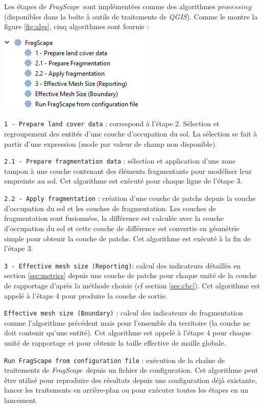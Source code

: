 \documentclass[11pt]{article}
\newcommand{\tool}{\emph{FragScape}}
\newcommand{\qgis}{\emph{QGIS}}
\let\tempone\itemize
\let\temptwo\enditemize
\renewenvironment{enumerate}{\tempone\addtolength{\itemsep}{-0.5\baselineskip}}{\temptwo}
\begin{document}
\begin{minipage}[c]{.46\linewidth}
Les étapes de \tool\ sont implémentées comme des algorithmes $processing$ (disponibles dans la boîte à outils de traitements de \qgis). Comme le montre la figure \ref{fig:algs}, cinq algorithmes sont fournis :
\end{minipage} \hfill
\begin{minipage}[c]{.5\linewidth}
    \includegraphics[scale=1]{pictures/algs.png}
    \captionof{figure}{Algorithmes de \tool}
    \label{fig:algs}
\end{minipage}


\begin{enumerate}
    \item \texttt{1 - Prepare land cover data} : correspond à l'étape 2. Sélection et regroupement des entités d'une couche d'occupation du sol. La sélection se fait à partir d'une expression (mode par valeur de champ non disponible).
    \item \texttt{2.1 - Prepare fragmentation data} : sélection et application d'une zone tampon à une couche contenant des éléments fragmentants pour modéliser leur empreinte au sol. Cet algorithme est exécuté pour chaque ligne de l'étape 3.
    \item \texttt{2.2 - Apply fragmentation} :  création d'une couche de patchs depuis la couche d'occupation du sol et les couches de fragmentation. Les couches de fragmentation sont fusionnées, la différence est calculée avec la couche d'occupation du sol et cette couche de différence est convertie en géométrie simple pour obtenir la couche de patchs. Cet algorithme est exécuté à la fin de l'étape 3.
    \item \texttt{3 - Effective mesh size (Reporting)}: calcul des indicateurs détaillés en section \ref{sec:metrics} depuis une couche de patchs pour chaque unité de la couche de rapportage d'après la méthode choisie (cf section \ref{sec:cbc}). Cet algorithme est appelé à l'étape 4 pour produire la couche de sortie.
    \item \texttt{Effective mesh size (Boundary)} : calcul des indicateurs de fragmentation comme l'algorithme précédent mais pour l'ensemble du territoire (la couche ne doit contenir qu'une entité). Cet algorithme est appelé à l'étape 4 pour chaque unité de rapportage et pour obtenir la taille effective de maille globale.
    \item \texttt{Run FragScape from configuration file} : exécution de la chaîne de traitements de \tool\ depuis un fichier de configuration. Cet algorithme peut être utilisé pour reproduire des résultats depuis une configuration déjà existante, lancer les traitements en arrière-plan ou pour exécuter toutes les étapes en un lancement.
\end{enumerate}
\end{document}
